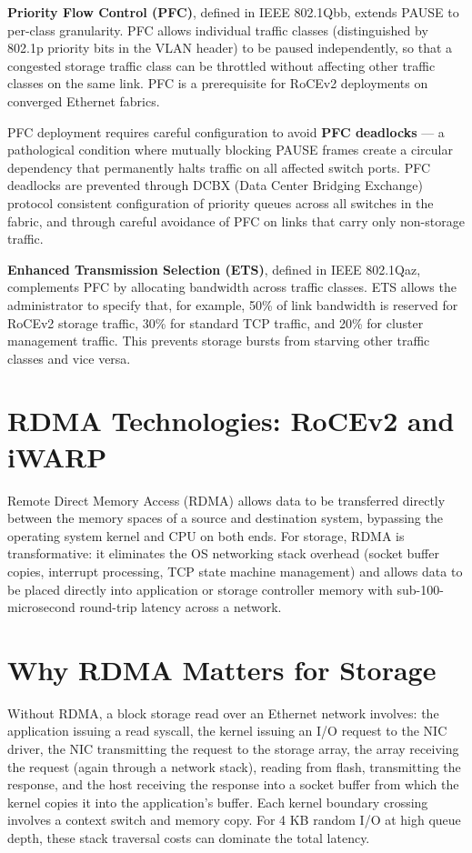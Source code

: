 \textbf{Priority Flow Control (PFC)}, defined in IEEE 802.1Qbb, extends PAUSE to per-class granularity. PFC allows individual traffic classes (distinguished by 802.1p priority bits in the VLAN header) to be paused independently, so that a congested storage traffic class can be throttled without affecting other traffic classes on the same link. PFC is a prerequisite for RoCEv2 deployments on converged Ethernet fabrics.

PFC deployment requires careful configuration to avoid \textbf{PFC deadlocks} --- a pathological condition where mutually blocking PAUSE frames create a circular dependency that permanently halts traffic on all affected switch ports. PFC deadlocks are prevented through DCBX (Data Center Bridging Exchange) protocol consistent configuration of priority queues across all switches in the fabric, and through careful avoidance of PFC on links that carry only non-storage traffic.

\textbf{Enhanced Transmission Selection (ETS)}, defined in IEEE 802.1Qaz, complements PFC by allocating bandwidth across traffic classes. ETS allows the administrator to specify that, for example, 50\% of link bandwidth is reserved for RoCEv2 storage traffic, 30\% for standard TCP traffic, and 20\% for cluster management traffic. This prevents storage bursts from starving other traffic classes and vice versa.

\section{RDMA Technologies: RoCEv2 and iWARP}
Remote Direct Memory Access (RDMA) allows data to be transferred directly between the memory spaces of a source and destination system, bypassing the operating system kernel and CPU on both ends. For storage, RDMA is transformative: it eliminates the OS networking stack overhead (socket buffer copies, interrupt processing, TCP state machine management) and allows data to be placed directly into application or storage controller memory with sub-100-microsecond round-trip latency across a network.

\section{Why RDMA Matters for Storage}
Without RDMA, a block storage read over an Ethernet network involves: the application issuing a read syscall, the kernel issuing an I/O request to the NIC driver, the NIC transmitting the request to the storage array, the array receiving the request (again through a network stack), reading from flash, transmitting the response, and the host receiving the response into a socket buffer from which the kernel copies it into the application's buffer. Each kernel boundary crossing involves a context switch and memory copy. For 4 KB random I/O at high queue depth, these stack traversal costs can dominate the total latency.

